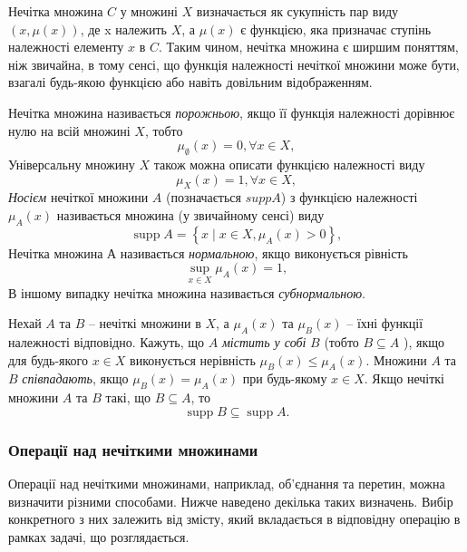 \documentclass[14pt, a4paper, oneside]{extarticle}
\numberwithin{equation}{section}
\begin{document}
Нечітка множина $C$ у множині $X$ визначається як сукупність пар виду $(x, \mu(x))$, де x належить $X$, а $\mu(x)$ є функцією, яка призначає ступінь належності елементу $x$ в $C$. Таким чином, нечітка множина є ширшим поняттям, ніж звичайна, в тому сенсі, що функція належності нечіткої множини може бути, взагалі будь-якою функцією або навіть довільним відображенням.

Нечітка множина називається \textit{порожньою}, якщо її функція належності дорівнює нулю на всій множині $X$, тобто
\begin{equation*}
    \mu_\emptyset (x) = 0, \forall x \in X,
\end{equation*}
Універсальну множину $X$ також можна описати функцією належності виду
\begin{equation*}
\mu_X (x) = 1, \forall x \in X,
\end{equation*}
\textit{Носієм} нечіткої множини $A$ (позначається $supp A$) з функцією належності $\mu_A (x)$ називається множина (у звичайному сенсі) виду
\begin{equation*}
\operatorname{supp} A=\left\{x \mid x \in X, \mu_A(x)>0\right\},
\end{equation*}
Нечітка множина $А$ називається \textit{нормальною}, якщо виконується рівність
\begin{equation*}
\sup _{x \in X} \mu_A(x)=1,
\end{equation*}
В іншому випадку нечітка множина називається \textit{субнормальною}.

Нехай $A$ та $B$ -- нечіткі множини в $X$, а $\mu_{A}(x)$ та $\mu_B(x)$ -- їхні функції належності відповідно. Кажуть, що $A$ \textit{містить у собі} $B$ (тобто $B \subseteq A$ ), якщо для будь-якого $x \in X$ виконується нерівність $\mu_B(x) \leq \mu_A(x)$. Множини $A$ та $B$ \textit{співпадають}, якщо $\mu_B(x)=\mu_A(x)$ при будь-якому $x \in X$. Якщо нечіткі множини $A$ та $B$ такі, що $B \subseteq A$, то
\begin{equation*}
\operatorname{supp} B \subseteq \operatorname{supp} A.\end{equation*}
\subsubsection{Операції над нечіткими множинами}
Операції над нечіткими множинами, наприклад, об'єднання та перетин, можна визначити різними способами. Нижче наведено декілька таких визначень. Вибір конкретного з них залежить від змісту, який вкладається в відповідну операцію в рамках задачі, що розглядається.
\end{document}
